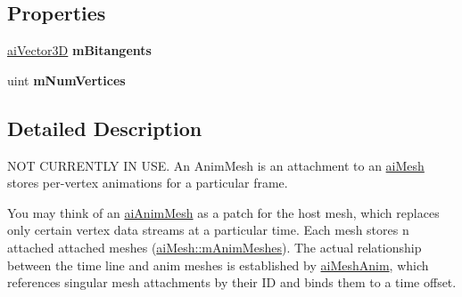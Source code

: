 \subsection*{Properties}
\begin{DoxyCompactItemize}
\item 
\hypertarget{structai_anim_mesh_aa56b4b0d53a9449f8ccb9163b632ea57}{\hyperlink{structai_vector3_d}{ai\+Vector3\+D} {\bfseries m\+Bitangents}}\label{structai_anim_mesh_aa56b4b0d53a9449f8ccb9163b632ea57}

\item 
\hypertarget{structai_anim_mesh_a0ec7018c98c6e704a6a37e920077cd80}{uint {\bfseries m\+Num\+Vertices}}\label{structai_anim_mesh_a0ec7018c98c6e704a6a37e920077cd80}

\end{DoxyCompactItemize}


\subsection{Detailed Description}
N\+O\+T C\+U\+R\+R\+E\+N\+T\+L\+Y I\+N U\+S\+E. An Anim\+Mesh is an attachment to an \hyperlink{structai_mesh}{ai\+Mesh} stores per-\/vertex animations for a particular frame. 

You may think of an \hyperlink{structai_anim_mesh}{ai\+Anim\+Mesh} as a {\ttfamily patch} for the host mesh, which replaces only certain vertex data streams at a particular time. Each mesh stores n attached attached meshes (\hyperlink{structai_mesh_a5078f7db7e99ed05db89dfa412f0e990}{ai\+Mesh\+::m\+Anim\+Meshes}). The actual relationship between the time line and anim meshes is established by \hyperlink{structai_mesh_anim}{ai\+Mesh\+Anim}, which references singular mesh attachments by their I\+D and binds them to a time offset. 

